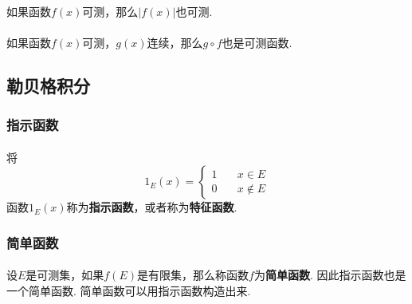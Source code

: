 \paragraph{}
如果函数$f(x)$可测，那么$|f(x)|$也可测.

\paragraph{}
如果函数$f(x)$可测，$g(x)$连续，那么$g \circ f$也是可测函数. 

\subsection{勒贝格积分}

\subsubsection{指示函数}
\paragraph{}
将
$$
1_E(x) =
  \begin{cases}
    1   & \quad x \in E \\
    0  & \quad x \notin E
  \end{cases}
$$
函数$1_E(x)$称为\textbf{指示函数}，或者称为\textbf{特征函数}.

\subsubsection{简单函数}
\paragraph{}
设$E$是可测集，如果$f(E)$是有限集，那么称函数$f$为\textbf{简单函数}. 因此指示函数也是一个简单函数.  简单函数可以用指示函数构造出来.


